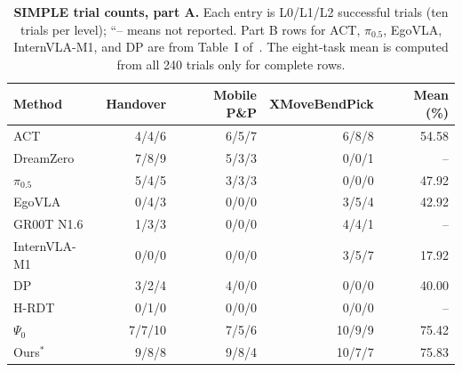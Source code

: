 \begin{table}[t]\centering\small
\caption{\textbf{SIMPLE trial counts, part A.} Each entry is L0/L1/L2 successful trials (ten trials per level); ``-- means not reported. Part B rows for ACT, $\pi_{0.5}$, EgoVLA, InternVLA-M1, and DP are from Table~I of~\cite{chen2026memorybeforegoal}. The eight-task mean is computed from all 240 trials only for complete rows.}
\label{tab:simple_a}
\setlength{\tabcolsep}{6pt}\begin{tabular}{lrrrr}\toprule
Method & Handover & Mobile P\&P & XMoveBendPick & Mean (\%)\\\midrule
ACT & 4/4/6 & 6/5/7 & 6/8/8 & 54.58\\
DreamZero & 7/8/9 & 5/3/3 & 0/0/1 & --\\
$\pi_{0.5}$ & 5/4/5 & 3/3/3 & 0/0/0 & 47.92\\
EgoVLA & 0/4/3 & 0/0/0 & 3/5/4 & 42.92\\
GR00T N1.6 & 1/3/3 & 0/0/0 & 4/4/1 & --\\
InternVLA-M1 & 0/0/0 & 0/0/0 & 3/5/7 & 17.92\\
DP & 3/2/4 & 4/0/0 & 0/0/0 & 40.00\\
H-RDT & 0/1/0 & 0/0/0 & 0/0/0 & --\\
$\Psi_0$ & 7/7/10 & 7/5/6 & 10/9/9 & 75.42\\
Ours$^{*}$ & 9/8/8 & 9/8/4 & 10/7/7 & 75.83\\
\bottomrule\end{tabular}\end{table}
